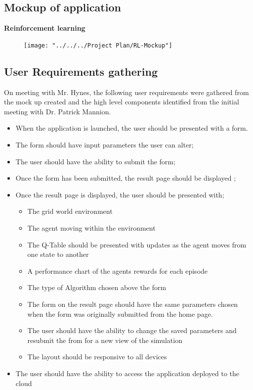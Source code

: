 \subsection {Mockup of application}
\textbf{Reinforcement learning}\\
\begin{figure}[H]
	\centering
	\texttt{[image: "../../../Project Plan/RL-Mockup"]}
	\caption{}
	\label{fig:gridworldenv}
\end{figure}

\subsection {User Requirements gathering}
On meeting with Mr. Hynes, the following user requirements were gathered from the mock up created and the high level components identified from the initial meeting with Dr. Patrick Mannion.
\begin{itemize}
	\item When the application is launched, the user should be presented with a form.
	\item The form should have input parameters the user can alter;
	\item The user should have the ability to submit the form;
	\item Once the form has been submitted, the result page should be displayed ;
	\item Once the result page is displayed, the user should be presented with;
	\begin{itemize}
		\item The grid world environment
		\item The agent moving within the environment
		\item The Q-Table should be presented with updates as the agent moves from one state to another
		\item A performance chart of the agents rewards for each episode 
		\item The type of Algorithm chosen above the form 
		\item The form on the result page should have the same parameters chosen when the form was originally submitted from the home page.
		\item The user should have the ability to change the saved parameters and resubmit the from for a new view of the simulation
		\item The layout should be responsive to all devices
		
	\end{itemize}
	\item The user should have the ability to access the application deployed to the cloud 
\end{itemize}
